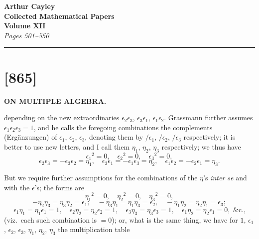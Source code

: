 \documentclass[12pt,a4paper]{article}
\theoremstyle{definition}
\begin{document}
\begin{center}
\Large\textbf{Arthur Cayley}\\[6pt]
\LARGE\textbf{Collected Mathematical Papers}\\[4pt]
\Large\textbf{Volume XII}\\[8pt]
\large\textit{Pages 501--550}
\end{center}

\vspace{1em}
\hrule
\vspace{2em}

\newpage
\section*{[865]}
\begin{center}
\large\textbf{ON MULTIPLE ALGEBRA.}
\end{center}

\setcounter{equation}{0}
\noindent[865

\vspace{-1em}]
depending on the new extraordinaries $\epsilon_2 \epsilon_3$, $\epsilon_3 \epsilon_1$, $\epsilon_1 \epsilon_2$.
Grassmann further assumes $\epsilon_1 \epsilon_2 \epsilon_3 = 1$, and he calls the foregoing
combinations the complements (Erg\"anzungen) of $\epsilon_1$, $\epsilon_2$, $\epsilon_3$, denoting
them by $/\epsilon_1$, $/\epsilon_2$, $/\epsilon_3$ respectively; it is better to use new letters,
and I call them $\eta_1$, $\eta_2$, $\eta_3$ respectively; we thus have
\[
\epsilon_1{}^2 = 0, \quad \epsilon_2{}^2 = 0, \quad \epsilon_3{}^2 = 0,
\]
\[
\epsilon_2 \epsilon_3 = - \epsilon_3 \epsilon_2 = \eta_1, \quad
\epsilon_3 \epsilon_1 = - \epsilon_1 \epsilon_3 = \eta_2, \quad
\epsilon_1 \epsilon_2 = - \epsilon_2 \epsilon_1 = \eta_3.
\]

But we require further assumptions for the combinations of the $\eta$'s
\textit{inter se} and with the $\epsilon$'s; the forms are
\[
\eta_1{}^2 = 0, \quad \eta_2{}^2 = 0, \quad \eta_3{}^2 = 0,
\]
\[
- \eta_2 \eta_3 = \eta_3 \eta_2 = \epsilon_1; \quad
- \eta_3 \eta_1 = \eta_1 \eta_3 = \epsilon_2, \quad
- \eta_1 \eta_2 = \eta_2 \eta_1 = \epsilon_3;
\]
\[
\epsilon_1 \eta_1 = \eta_1 \epsilon_1 = 1, \quad
\epsilon_2 \eta_2 = \eta_2 \epsilon_2 = 1, \quad
\epsilon_3 \eta_3 = \eta_3 \epsilon_3 = 1, \quad
\epsilon_1 \eta_2 = \eta_2 \epsilon_1 = 0, \text{ \&c.,}
\]
(viz.\ each such combination is $=0$); or, what is the same thing, we have for
$1$, $\epsilon_1$, $\epsilon_2$, $\epsilon_3$, $\eta_1$, $\eta_2$, $\eta_3$ the multiplication table
\end{document}
